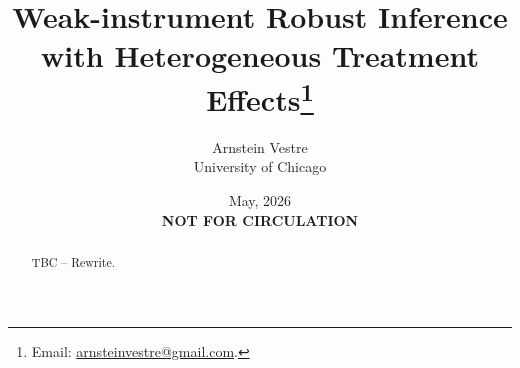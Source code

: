 \documentclass[a4paper, article, english, oneside, unknownkeysallowed, 12pt]{memoir}
\title{
Weak-instrument Robust Inference with Heterogeneous Treatment Effects\thanks{Email: \href{mailto:arnsteinvestre@gmail.com}{arnsteinvestre@gmail.com}.}}
\author{
Arnstein Vestre \\[-4pt] 
{\small University of Chicago} \\
}
\date{May, 2026 \\[8pt] {\small\textbf{NOT FOR CIRCULATION}} \vspace{-22pt}
} %
\begin{document}
\maketitle


\begin{bibunit}

\begin{abstract}
\noindent
TBC -- Rewrite.


\end{abstract}



\clearpage


\clearpage


\clearpage


\clearpage


\clearpage



\clearpage


\clearpage

\putbib

\end{bibunit}

\clearpage

\begin{bibunit}


\appendix 
\renewcommand\thesection{\Alph{section}}
\renewcommand\thesubsubsection{\Alph{section}.\arabic{subsection}.\roman{subsubsection}}


\renewcommand\thesection{\Alph{section}}



\clearpage

\putbib

\end{bibunit}
\end{document}
